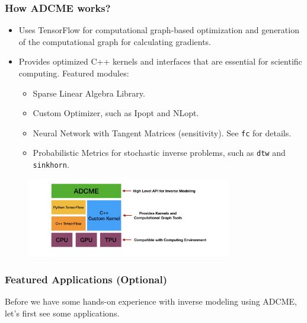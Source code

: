 \documentclass{beamer}
\begin{document}
\begin{frame}
	\frametitle{How ADCME works?}
	
	\begin{itemize}
		\item Uses TensorFlow for computational graph-based optimization and generation of the computational graph for calculating gradients.
		\item Provides optimized C++ kernels and interfaces that are essential for scientific computing. Featured modules:
		\begin{itemize}
		\item Sparse Linear Algebra Library. 
		\item Custom Optimizer, such as Ipopt and NLopt. 
		\item Neural Network with Tangent Matrices (sensitivity). See \texttt{fc} for details. 
		\item Probabilistic Metrics for stochastic inverse problems, such as \texttt{dtw} and \texttt{sinkhorn}.
		\end{itemize}
		
		  
	\end{itemize}
	
	\begin{figure}[hbt]
	\centering
  \includegraphics[width=0.8\textwidth]{figures/kernel2}
\end{figure}

\end{frame}
\begin{frame}
	\frametitle{Featured Applications (Optional)}
	
	Before we have some hands-on experience with inverse modeling using ADCME, let's first see some applications. 
\end{frame}
\end{document}
